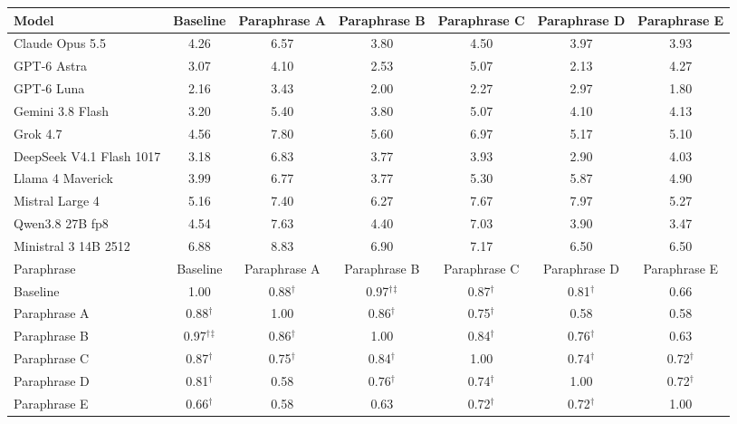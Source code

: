 \begin{tabular}{lcccccc}
\toprule
Model & Baseline & Paraphrase A & Paraphrase B & Paraphrase C & Paraphrase D & Paraphrase E \\
\midrule
Claude Opus 5.5 & 4.26 & 6.57 & 3.80 & 4.50 & 3.97 & 3.93 \\
GPT-6 Astra & 3.07 & 4.10 & 2.53 & 5.07 & 2.13 & 4.27 \\
GPT-6 Luna & 2.16 & 3.43 & 2.00 & 2.27 & 2.97 & 1.80 \\
Gemini 3.8 Flash & 3.20 & 5.40 & 3.80 & 5.07 & 4.10 & 4.13 \\
Grok 4.7 & 4.56 & 7.80 & 5.60 & 6.97 & 5.17 & 5.10 \\
DeepSeek V4.1 Flash 1017 & 3.18 & 6.83 & 3.77 & 3.93 & 2.90 & 4.03 \\
Llama 4 Maverick & 3.99 & 6.77 & 3.77 & 5.30 & 5.87 & 4.90 \\
Mistral Large 4 & 5.16 & 7.40 & 6.27 & 7.67 & 7.97 & 5.27 \\
Qwen3.8 27B fp8 & 4.54 & 7.63 & 4.40 & 7.03 & 3.90 & 3.47 \\
Ministral 3 14B 2512 & 6.88 & 8.83 & 6.90 & 7.17 & 6.50 & 6.50 \\
\midrule
Paraphrase & Baseline & Paraphrase A & Paraphrase B & Paraphrase C & Paraphrase D & Paraphrase E \\
\midrule
Baseline & 1.00 & 0.88$^\dagger$ & 0.97$^\dagger$$^\ddagger$ & 0.87$^\dagger$ & 0.81$^\dagger$ & 0.66 \\
Paraphrase A & 0.88$^\dagger$ & 1.00 & 0.86$^\dagger$ & 0.75$^\dagger$ & 0.58 & 0.58 \\
Paraphrase B & 0.97$^\dagger$$^\ddagger$ & 0.86$^\dagger$ & 1.00 & 0.84$^\dagger$ & 0.76$^\dagger$ & 0.63 \\
Paraphrase C & 0.87$^\dagger$ & 0.75$^\dagger$ & 0.84$^\dagger$ & 1.00 & 0.74$^\dagger$ & 0.72$^\dagger$ \\
Paraphrase D & 0.81$^\dagger$ & 0.58 & 0.76$^\dagger$ & 0.74$^\dagger$ & 1.00 & 0.72$^\dagger$ \\
Paraphrase E & 0.66$^\dagger$ & 0.58 & 0.63 & 0.72$^\dagger$ & 0.72$^\dagger$ & 1.00 \\
\bottomrule
\end{tabular}
